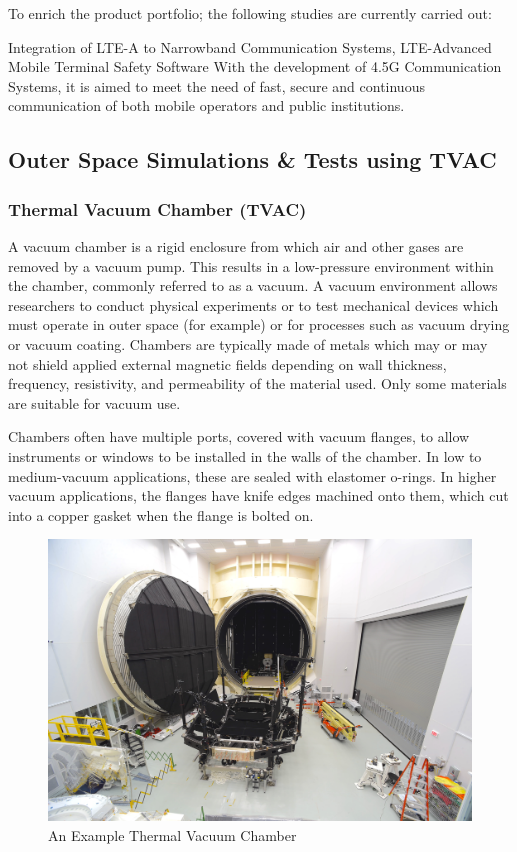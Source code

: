 	To enrich the product portfolio; the following studies are currently carried out:

	Integration of LTE-A to Narrowband Communication Systems,
LTE-Advanced Mobile Terminal Safety Software  
With the development of 4.5G Communication Systems, it is aimed to meet the need of fast, secure and continuous communication of both mobile operators and public institutions.


\vfill


\subsection{Outer Space Simulations \& Tests using TVAC  }

\subsubsection{Thermal Vacuum Chamber (TVAC) }

	A vacuum chamber is a rigid enclosure from which air and other gases are removed by a vacuum pump. This results in a low-pressure environment within the chamber, commonly referred to as a vacuum. A vacuum environment allows researchers to conduct physical experiments or to test mechanical devices which must operate in outer space (for example) or for processes such as vacuum drying or vacuum coating. Chambers are typically made of metals which may or may not shield applied external magnetic fields depending on wall thickness, frequency, resistivity, and permeability of the material used. Only some materials are suitable for vacuum use.

Chambers often have multiple ports, covered with vacuum flanges, to allow instruments or windows to be installed in the walls of the chamber. In low to medium-vacuum applications, these are sealed with elastomer o-rings. In higher vacuum applications, the flanges have knife edges machined onto them, which cut into a copper gasket when the flange is bolted on.

\begin{figure}[H]
	\center
	\setlength{\unitlength}{\textwidth} 
	\includegraphics[width=1.0\unitlength]{tvac}
	\caption{\label{fig:tvac}An Example Thermal Vacuum Chamber }
\end{figure}

